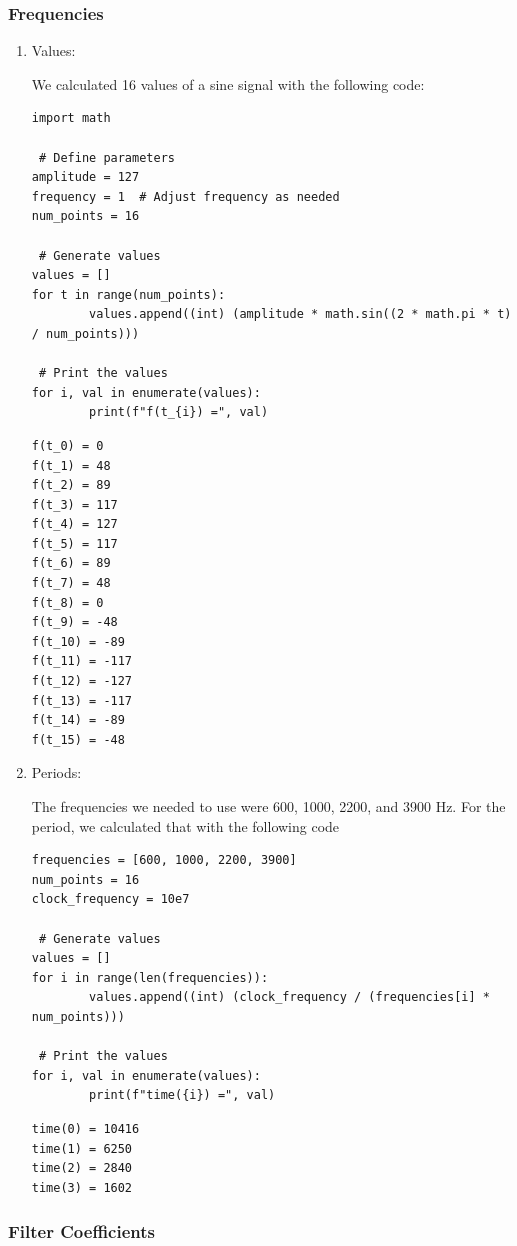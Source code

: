 \documentclass[a4paper, 12pt]{article}
\begin{document}
\subsubsection{Frequencies}
\label{sec:org703a37d}
\begin{enumerate}
\item Values:
\label{sec:org3e00c26}

We calculated 16 values of a sine signal with the following code:

\begin{verbatim}
import math

 # Define parameters
amplitude = 127
frequency = 1  # Adjust frequency as needed
num_points = 16

 # Generate values
values = []
for t in range(num_points):
        values.append((int) (amplitude * math.sin((2 * math.pi * t) / num_points)))

 # Print the values
for i, val in enumerate(values):
        print(f"f(t_{i}) =", val)
\end{verbatim}

\begin{verbatim}
f(t_0) = 0
f(t_1) = 48
f(t_2) = 89
f(t_3) = 117
f(t_4) = 127
f(t_5) = 117
f(t_6) = 89
f(t_7) = 48
f(t_8) = 0
f(t_9) = -48
f(t_10) = -89
f(t_11) = -117
f(t_12) = -127
f(t_13) = -117
f(t_14) = -89
f(t_15) = -48
\end{verbatim}
\item Periods:
\label{sec:org202eb8e}

The frequencies we needed to use were 600, 1000, 2200, and 3900 Hz. For the period, we calculated that with the following code

\begin{verbatim}
frequencies = [600, 1000, 2200, 3900]
num_points = 16
clock_frequency = 10e7

 # Generate values
values = []
for i in range(len(frequencies)):
        values.append((int) (clock_frequency / (frequencies[i] * num_points)))

 # Print the values
for i, val in enumerate(values):
        print(f"time({i}) =", val)
\end{verbatim}

\begin{verbatim}
time(0) = 10416
time(1) = 6250
time(2) = 2840
time(3) = 1602
\end{verbatim}
\end{enumerate}
\subsubsection{Filter Coefficients}
\label{sec:orgd735e0d}
\end{document}
